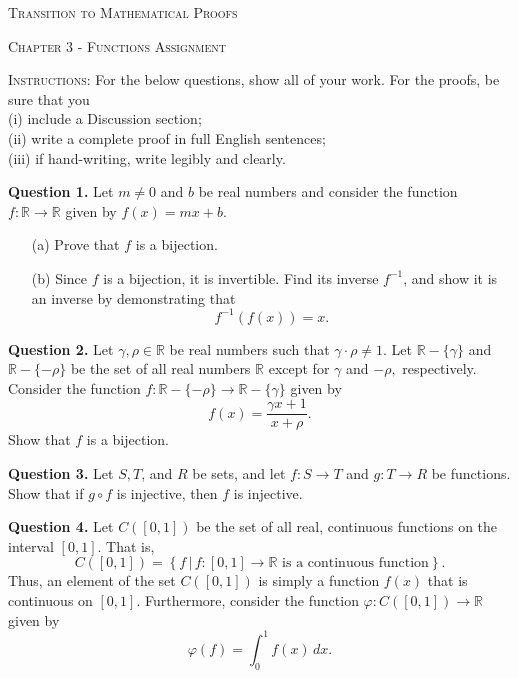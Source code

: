 \documentclass[10pt]{report}
\begin{document}
\begin{center}\textsc{\Large Transition to Mathematical Proofs}

\textsc{\large Chapter 3 - Functions Assignment}

\bigskip

\end{center}

\noindent\textsc{Instructions:}  For the below questions, show all of your work.  For the proofs, be sure that you \\

\noindent(i) include a Discussion section; \\
(ii) write a complete proof in full English sentences; \\
(iii) if hand-writing, write legibly and clearly.


\bigskip

\noindent\textbf{Question 1.}  Let $m\neq 0$ and $b$ be real numbers and consider the function $f: \mathbb R \to \mathbb R$ given by $f(x) = mx + b$.  

\begin{itemize}

\item[(a)]  Prove that $f$ is a bijection.

\item[(b)]  Since $f$ is a bijection, it is invertible.  Find its inverse $f^{-1}$, and show it is an inverse by demonstrating that $$f^{-1}(f(x)) = x.$$


\end{itemize}

\bigskip\bigskip

\noindent\textbf{Question 2.}  Let $\gamma, \rho \in \mathbb R$ be real numbers such that $\gamma \cdot \rho \neq 1$.   Let $\mathbb R \! - \! \{\gamma\}$ and $\mathbb R \!- \! \{-\rho\}$ be the set of all real numbers $\mathbb R$ except for $\gamma$ and $-\rho,$ respectively.  Consider the function $f: \mathbb R \! - \! \{-\rho\} \to \mathbb R \! - \! \{\gamma\}$ given by $$f(x) = \frac{\gamma x + 1}{x + \rho}.$$  Show that $f$ is a bijection.  

\bigskip\bigskip


\noindent\textbf{Question 3.}  Let $S, T$, and $R$ be sets, and let $f: S \to T$ and $g: T \to R$ be functions.  Show that if $g \circ f$ is injective, then $f$ is injective. 



\bigskip\bigskip


\noindent\textbf{Question 4.}  Let $C([0,1])$ be the set  of all real, continuous functions on the interval $[0,1].$  That is, $$C([0,1]) = \left\{ f \, \vert \, f: [0,1] \to \mathbb R \textrm{   is a continuous function} \right\}.$$  Thus, an element of the set $C([0,1])$ is simply a function $f(x)$ that is continuous on $[0,1]$.   Furthermore, consider the function $\varphi: C([0,1]) \to \mathbb R$ given by $$\varphi (f) = \int_0^1 f(x) \, dx.$$
\end{document}
